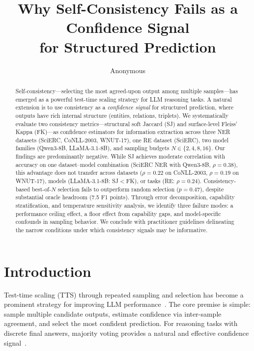 \documentclass[11pt,a4paper]{article}
\title{Why Self-Consistency Fails as a Confidence Signal\\for Structured Prediction}
\author{Anonymous}
\begin{document}
\maketitle

\begin{abstract}
Self-consistency---selecting the most agreed-upon output among multiple samples---has emerged as a powerful test-time scaling strategy for LLM reasoning tasks.
A natural extension is to use consistency as a \emph{confidence signal} for structured prediction, where outputs have rich internal structure (entities, relations, triplets).
We systematically evaluate two consistency metrics---structural soft Jaccard (SJ) and surface-level Fleiss' Kappa (FK)---as confidence estimators for information extraction across three NER datasets (SciERC, CoNLL-2003, WNUT-17), one RE dataset (SciERC), two model families (Qwen3-8B, LLaMA-3.1-8B), and sampling budgets $N \in \{2,4,8,16\}$.
Our findings are predominantly negative.
While SJ achieves moderate correlation with accuracy on one dataset--model combination (SciERC NER with Qwen3-8B, $\rho{=}0.38$), this advantage does not transfer across datasets ($\rho{=}0.22$ on CoNLL-2003, $\rho{=}0.19$ on WNUT-17), models (LLaMA-3.1-8B: SJ$<$FK), or tasks (RE: $\rho{=}0.24$).
Consistency-based best-of-$N$ selection fails to outperform random selection ($p{=}0.47$), despite substantial oracle headroom (7.5 F1 points).
Through error decomposition, capability stratification, and temperature sensitivity analysis, we identify three failure modes: a performance ceiling effect, a floor effect from capability gaps, and model-specific confounds in sampling behavior.
We conclude with practitioner guidelines delineating the narrow conditions under which consistency signals may be informative.
\end{abstract}

\section{Introduction}

Test-time scaling (TTS) through repeated sampling and selection has become a prominent strategy for improving LLM performance~\cite{wang2023selfconsistency,brown2024large}.
The core premise is simple: sample multiple candidate outputs, estimate confidence via inter-sample agreement, and select the most confident prediction.
For reasoning tasks with discrete final answers, majority voting provides a natural and effective confidence signal~\cite{wang2023selfconsistency}.
\end{document}
